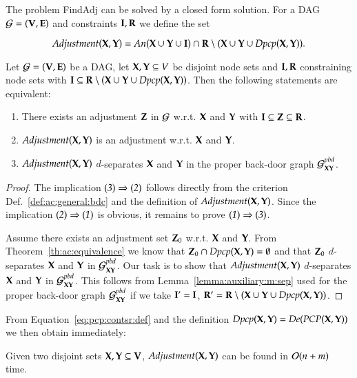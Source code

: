\begin{corollary}
\end{corollary}
%
%
%

The problem {\sc FindAdj} can be solved by a closed form solution. 
For a DAG ${\cal G}=({\bf V},{\bf E})$ and constraints $ {\bf I},{\bf R} $ we define the set
\begin{newpartinrevision}[r2c50]
$$
   \textit{Adjustment}({\bf X},{\bf Y}) 
= \textit{An}({\bf X} \cup {\bf Y} \cup {\bf I}) \cap {\bf R} \setminus ({\bf X} \cup {\bf Y} \cup \textit{Dpcp}({\bf X},{\bf Y})). 
$$
\end{newpartinrevision}
%
\begin{theorem}\label{th:adj:set:cosctr}
Let ${\cal G}=({\bf V},{\bf E})$ be a DAG, let ${\bf X},{\bf Y} \subseteq V$ be disjoint node sets and $ {\bf I}, {\bf R} $ constraining node sets with ${\bf I} \subseteq {\bf R} \setminus ({\bf X} \cup {\bf Y} \cup \textit{Dpcp}({\bf X},{\bf Y}))$. 
Then the following statements are equivalent:
\begin{enumerate} 
\item There exists an adjustment $ {\bf Z} $ in ${\cal G}$ w.r.t. ${\bf X}$ and ${\bf Y}$ with $ {\bf I}\subseteq{\bf Z}\subseteq{\bf R} $.
\item $\textit{Adjustment}({\bf X},{\bf Y})$ is an adjustment w.r.t. ${\bf X}$ and ${\bf Y}$.
\item $\textit{Adjustment}({\bf X},{\bf Y})$ $d$-separates ${\bf X}$ and ${\bf Y}$ in the proper back-door graph ${\cal G}^{pbd}_{{\bf X}{\bf Y}}$.
\end{enumerate}
\end{theorem}

\begin{proof}
The implication $\it (3)\Rightarrow(2)$ follows directly from 
the criterion Def.~\ref{def:ac:general:bdc} and the definition
of $\textit{Adjustment}({\bf X},{\bf Y})$. Since the implication $\it (2)\Rightarrow(1)$
is obvious, it remains to prove  $\it (1)\Rightarrow(3)$. 
 
Assume there exists an adjustment set ${\bf Z}_0$ w.r.t. ${\bf X}$ and ${\bf Y}$.
From Theorem~\ref{th:ac:equivalence} we know that  
${\bf Z}_0 \cap \textit{Dpcp}({\bf X},{\bf Y})= \emptyset$ and  that 
${\bf Z}_0$ $d$-separates ${\bf X}$ and ${\bf Y}$ in ${\cal G}^{pbd}_{{\bf X}{\bf Y}}$.
Our task is to show that $\textit{Adjustment}({\bf X},{\bf Y})$ $d$-separates 
${\bf X}$ and  ${\bf Y}$ in ${\cal G}^{pbd}_{{\bf X}{\bf Y}}$. This follows from  Lemma~\ref{lemma:auxiliary:m:sep}
used for the proper back-door graph ${\cal G}^{pbd}_{{\bf X}{\bf Y}}$
if we take  ${\bf I}'={\bf I}$, ${\bf R}'={\bf R} \setminus ({\bf X} \cup {\bf Y} \cup \textit{Dpcp}({\bf X},{\bf Y}))$.
\end{proof}
From Equation~\eqref{eq:pcp:contsr:def} and the definition $\textit{Dpcp}({\bf X},{\bf Y})  = \textit{De}(\textit{PCP}({\bf X},{\bf Y}))$  
we then obtain immediately:
\begin{corollary}\label{enum:fastas}
Given two disjoint sets ${\bf X}, {\bf Y} \subseteq {\bf V}$,  $\textit{Adjustment}({\bf X},{\bf Y})$ 
can be found in ${\cal O}(n+m)$ time.
\end{corollary}



